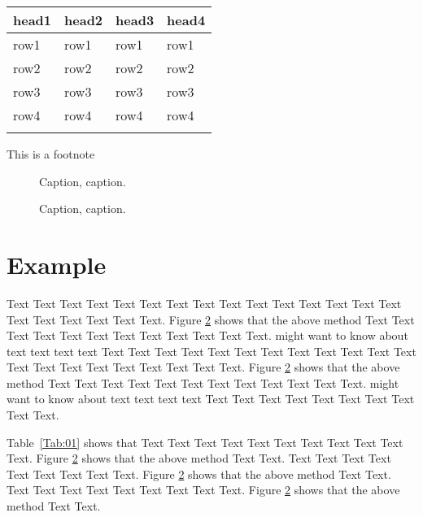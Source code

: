 \documentclass{bioinfo}
\begin{document}
\begin{methods}
\begin{table}[!t]
{\begin{tabular}{llll}\toprule
head1 & head2 & head3 & head4\\\midrule
row1 & row1 & row1 & row1\\
row2 & row2 & row2 & row2\\
row3 & row3 & row3 & row3\\
row4 & row4 & row4 & row4\\\botrule
\end{tabular}}{This is a footnote}
\end{table}

\end{methods}

\begin{figure}[!tpb]%
\caption{Caption, caption.}\label{fig:01}
\end{figure}

\begin{figure}[!tpb]%
\caption{Caption, caption.}\label{fig:02}
\end{figure}

\section{Example}

Text Text Text Text Text Text  Text Text Text Text Text Text Text Text Text  Text Text Text Text Text Text. Figure \ref{fig:02} shows that the above method  Text Text Text Text  Text Text Text Text Text Text  Text Text.  \citealp{Boffelli03} might want to know about  text text text text
Text Text Text Text Text Text  Text Text Text Text Text Text Text Text Text  Text Text Text Text Text Text. Figure \ref{fig:02} shows that the above method  Text Text Text Text  Text Text Text Text Text Text  Text Text.  \citealp{Boffelli03} might want to know about  text text text text
Text Text Text Text Text Text  Text Text Text Text.




Table~\ref{Tab:01} shows that Text Text Text Text Text  Text Text Text Text Text Text. Figure \ref{fig:02} shows that
the above method Text Text. Text Text Text  Text Text Text Text Text Text. Figure \ref{fig:02} shows that
the above method Text Text. Text Text Text  Text Text Text Text Text Text. Figure \ref{fig:02} shows that
the above method Text Text.
\end{document}
